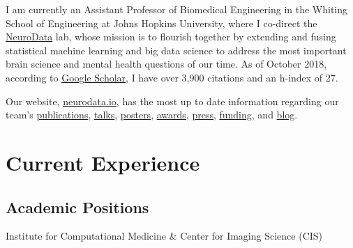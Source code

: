 \documentclass[10pt,colorlinks=true,urlcolor=blue]{moderncv}
\begin{document}
\maketitle

I am currently an Assistant Professor of Biomedical Engineering in the Whiting School of Engineering at Johns Hopkins University, where I co-direct the \href{https://neurodata.io/}{NeuroData} lab, whose mission is to flourish together by extending and fusing statistical machine learning and big data science to address the most important brain science and mental health questions of our time. As of October 2018, according to \href{https://scholar.google.com/citations?user=DWPfdT4AAAAJ&hl=en&oi=ao}{Google Scholar}, I have over 3,900 citations and an h-index of 27.  

\vspace{10pt}

Our website, \href{https://neurodata.io}{neurodata.io},  has the most up to date information regarding our team's
% 
	  \href{https://neurodata.io/publications/}{publications},
	  \href{https://neurodata.io/talks/}{talks},
	  \href{https://neurodata.io/presentations/#posters}{posters},
	  \href{https://neurodata.io/awards}{awards},
	  \href{https://neurodata.io/press}{press},
	  \href{https://github.com/jovo/cv/raw/master/CP_Vogelstein.pdf}{funding}, and
	  \href{https://blog.neurodata.io/}{blog}.

\section{Current  Experience}
\subsection{Academic Positions}
{Institute for Computational Medicine  \&  Center for Imaging Science (CIS)}{}{}{}


\end{document}
